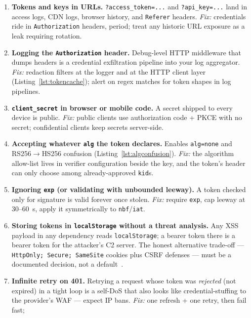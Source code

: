 \begin{enumerate}
  \item \textbf{Tokens and keys in URLs.} \texttt{?access\_token=...} and
        \texttt{?api\_key=...} land in access logs, CDN logs, browser
        history, and \texttt{Referer} headers. \emph{Fix:} credentials ride
        in \texttt{Authorization} headers, period; treat any historic URL
        exposure as a leak requiring rotation.
  \item \textbf{Logging the \texttt{Authorization} header.} Debug-level
        HTTP middleware that dumps headers is a credential exfiltration
        pipeline into your log aggregator. \emph{Fix:} redaction filters at
        the logger and at the HTTP client layer (Listing~\ref{lst:tokencache});
        alert on regex matches for token shapes in log pipelines.
  \item \textbf{\texttt{client\_secret} in browser or mobile code.} A secret
        shipped to every device is public. \emph{Fix:} public clients use
        authorization code + PKCE with no secret; confidential clients keep
        secrets server-side.
  \item \textbf{Accepting whatever \texttt{alg} the token declares.} Enables
        \texttt{alg=none} and RS256$\rightarrow$HS256 confusion
        (Listing~\ref{lst:algconfusion}). \emph{Fix:} the algorithm
        allow-list lives in verifier configuration beside the key, and the
        token's header can only choose among already-approved
        \texttt{kid}s.
  \item \textbf{Ignoring \texttt{exp} (or validating with unbounded
        leeway).} A token checked only for signature is valid forever once
        stolen. \emph{Fix:} require \texttt{exp}, cap leeway at 30--60~s,
        apply it symmetrically to \texttt{nbf}/\texttt{iat}.
  \item \textbf{Storing tokens in \texttt{localStorage} without a threat
        analysis.} Any XSS payload in any dependency reads
        \texttt{localStorage}; a bearer token there is a bearer token for
        the attacker's C2 server. The honest alternative trade-off ---
        \texttt{HttpOnly; Secure; SameSite} cookies plus CSRF defenses ---
        must be a documented decision, not a default~\cite{owaspapisecurity}.
  \item \textbf{Infinite retry on 401.} Retrying a request whose token was
        \emph{rejected} (not expired) in a tight loop is a self-DoS that
        also looks like credential-stuffing to the provider's WAF ---
        expect IP bans. \emph{Fix:} one refresh + one retry, then fail fast;

\end{enumerate}
